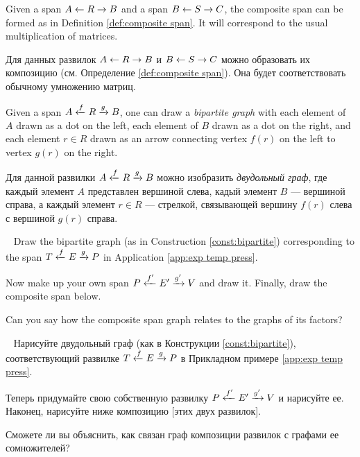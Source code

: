 \begin{blockENG}
Given a span $A\leftarrow R\rightarrow B$ and a span $B\leftarrow S\rightarrow C$, the composite span can be formed as in Definition \ref{def:composite span}. It will correspond to the usual multiplication of matrices.
\end{blockENG}

\begin{blockRUS}
Для данных развилок $A\leftarrow R\rightarrow B$ и $B\leftarrow S\rightarrow C$ можно образовать их композицию (см. Определение \ref{def:composite span}). Она будет соответствовать обычному умножению матриц.
\end{blockRUS}

\begin{constructionENG}\label{const:bipartite}
Given a span $A\xleftarrow{f} R\xrightarrow{g} B$, one can draw a {\em bipartite graph} with each element of $A$ drawn as a dot on the left, each element of $B$ drawn as a dot on the right, and each element $r\in R$ drawn as an arrow connecting vertex $f(r)$ on the left to vertex $g(r)$ on the right.
\end{constructionENG}

\begin{constructionRUS}\label{const:bipartite}
Для данной развилки $A\xleftarrow{f} R\xrightarrow{g} B$ можно изобразить {\em двудольный граф}, где каждый элемент $A$ представлен вершиной слева, кадый элемент $B$ — вершиной справа, а каждый элемент $r\in R$ — стрелкой, связывающей вершину $f(r)$ слева с вершиной $g(r)$ справа.
\end{constructionRUS}

\begin{exerciseENG}~
\sexc Draw the bipartite graph (as in Construction \ref{const:bipartite}) corresponding to the span $T\xleftarrow{f}E\xrightarrow{g}P$ in Application \ref{app:exp temp press}.
\item Now make up your own span $P\xleftarrow{f'}E'\xrightarrow{g'}V$ and draw it. Finally, draw the composite span below. 
\item Can you say how the composite span graph relates to the graphs of its factors?
\endsexc
\end{exerciseENG}

\begin{exerciseRUS}~
\sexc Нарисуйте двудольный граф (как в Конструкции \ref{const:bipartite}), соответствующий развилке $T\xleftarrow{f}E\xrightarrow{g}P$ в Прикладном примере \ref{app:exp temp press}.
\item Теперь придумайте свою собственную развилку $P\xleftarrow{f'}E'\xrightarrow{g'}V$ и нарисуйте ее. Наконец, нарисуйте ниже композицию [этих двух развилок]. 
\item Сможете ли вы объяснить, как связан граф композиции развилок с графами ее сомножителей?
\endsexc
\end{exerciseRUS}

